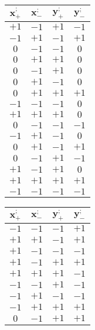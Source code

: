 \documentclass[11pt]{book}
\begin{document}
\begin{table}
  \color[HTML]{ef8182}
            \footnotesize
                \begin{tabular}{cccc}
        \toprule
        $\boldsymbol{x_{+}^{;}}$ & $\boldsymbol{x_{-}^{;}}$ & $\boldsymbol{y_{+}^{;}}$ & $\boldsymbol{y_{-}^{;}}$\\
        \midrule
        $+1$ & $-1$ & $+1$ & $-1$\\
        $-1$ & $+1$ & $-1$ & $+1$\\
        $0$ & $-1$ & $-1$ & $0$\\
        $0$ & $+1$ & $+1$ & $0$\\
        $0$ & $-1$ & $+1$ & $0$\\
        $0$ & $+1$ & $-1$ & $0$\\
        $0$ & $+1$ & $+1$ & $+1$\\
    $-1$ & $-1$ & $-1$ & $0$\\
        $+1$ & $+1$ & $+1$ & $0$\\
        $0$ & $-1$ & $-1$ & $-1$\\
        $-1$ & $+1$ & $-1$ & $0$\\
        $0$ & $+1$ & $-1$ & $+1$\\
        $0$ & $-1$ & $+1$ & $-1$\\
        $+1$ & $-1$ & $+1$ & $0$\\
        $+1$ & $+1$ & $+1$ & $+1$\\
        $-1$ & $-1$ & $-1$ & $-1$\\
        \bottomrule
        \end{tabular}
                \hfill                      \color[HTML]{dc982d}
                \begin{tabular}{cccc}
        \toprule
        $\boldsymbol{x_{+}^{;}}$ & $\boldsymbol{x_{-}^{;}}$ & $\boldsymbol{y_{+}^{;}}$ & $\boldsymbol{y_{-}^{;}}$\\
        \midrule
        $-1$ & $-1$ & $-1$ & $+1$\\
        $+1$ & $+1$ & $-1$ & $+1$\\
        $+1$ & $-1$ & $-1$ & $-1$\\
        $+1$ & $-1$ & $+1$ & $+1$\\
        $+1$ & $+1$ & $+1$ & $-1$\\
    $-1$ & $-1$ & $+1$ & $-1$\\
        $-1$ & $+1$ & $-1$ & $-1$\\
        $-1$ & $+1$ & $+1$ & $+1$\\
        $0$ & $-1$ & $+1$ & $+1$\\

\end{tabular}
\end{table}
\end{document}
